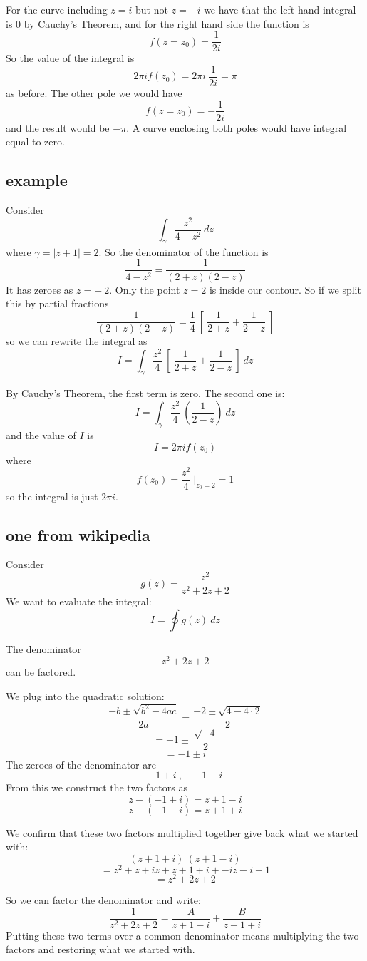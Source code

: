 \documentclass[11pt, oneside]{article}   	%
\begin{document}
For the curve including $z = i$ but not $z = -i$ we have that the left-hand integral is 0 by Cauchy's Theorem, and for the right hand side the function is
\[ f(z = z_0) = \frac{1}{2i} \]
So the value of the integral is
\[ 2 \pi i f(z_0) = 2 \pi i \ \frac{1}{2i} = \pi \]
as before.  The other pole we would have
\[ f(z = z_0) = -\frac{1}{2i} \]
and the result would be $- \pi$.  A curve enclosing both poles would have integral equal to zero.

\subsection*{example}
Consider
\[ \int_{\gamma} \frac{z^2}{4-z^2} \ dz \]
where $\gamma = | z + 1 | = 2$.
So the denominator of the function is
\[ \frac{1}{4-z^2} = \frac{1}{(2+z)(2-z)} \]
It has zeroes as $z = \pm \ 2$.  Only the point $z = 2$ is inside our contour.  So if we split this by partial fractions
\[  \frac{1}{(2+z)(2-z)} = \frac{1}{4} \ [ \ \frac{1}{2+z} + \frac{1}{2-z} \ ] \]
so we can rewrite the integral as
\[ I = \int_{\gamma} \frac{z^2}{4} \ [ \ \frac{1}{2+z} + \frac{1}{2-z} \ ] \ dz \]

By Cauchy's Theorem, the first term is zero.  The second one is:
\[ I = \int_{\gamma} \frac{z^2}{4} \ ( \frac{1}{2-z} ) \ dz \]
and the value of $I$ is
\[ I = 2 \pi i f(z_0) \]
where 
\[ f(z_0) = \frac{z^2}{4}  \ \bigg |_{z_0 = 2} = 1 \]
so the integral is just $2 \pi i$.

\subsection*{one from wikipedia}
Consider
\[ g(z) = \frac{z^2}{z^2 + 2z + 2} \]
We want to evaluate the integral:
\[ I = \oint g(z) \ dz \]

The denominator
\[ z^2 + 2z + 2 \]
can be factored.

We plug into the quadratic solution:
\[ \frac{-b \pm \sqrt{b^2 - 4ac}}{2a} =  \frac{-2 \pm \sqrt{4 - 4 \cdot 2}}{2} \]
\[ = -1 \pm \  \frac{\sqrt{-4}}{2} \]
\[ = -1 \pm i \]
The zeroes of the denominator are
\[ - 1 + i \ , \ \ \ - 1 - i \]
From this we construct the two factors as
\[ z - (- 1 + i) = z + 1 - i \]
\[ z - (-1 - i) = z + 1 + i \]

We confirm that these two factors multiplied together give back what we started with:
\[ (z + 1 + i) \ (z + 1 - i) \]
\[ = z^2 + z + iz + z + 1 + i + -iz - i + 1 \] 
\[ = z^2 + 2z + 2 \]

So we can factor the denominator and write:
\[ \frac{1}{z^2 + 2z + 2} = \frac{A}{z + 1 - i} + \frac{B}{z + 1 + i}  \]
Putting these two terms over a common denominator means multiplying the two factors and restoring what we started with.
\end{document}
